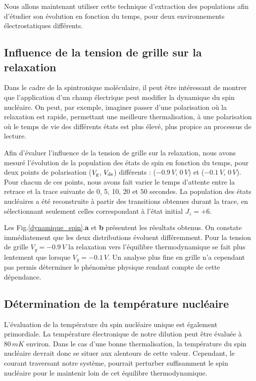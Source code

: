 Nous allons maintenant utiliser cette technique d'extraction des populations afin d'étudier son évolution en fonction du temps, pour deux environnements électrostatiques différents.

\subsection{Influence de la tension de grille sur la relaxation}
Dans le cadre de la spintronique moléculaire, il peut \^etre intéressant de montrer que l'application d'un champ électrique peut modifier la dynamique du spin nucléaire. On peut, par exemple, imaginer passer d'une polarisation où la relaxation est rapide, permettant une meilleure thermalisation, à une polarisation où le temps de vie des différents états est plus élevé, plus propice au processus de lecture.

Afin d'évaluer l'influence de la tension de grille sur la relaxation, nous avons mesuré l'évolution de la population des états de spin en fonction du temps, pour deux points de polarisation ($V_{\rm{g}}$, $V_{\rm{ds}}$) différents : ($-0.9\, V$, $0\, V$) et ($-0.1\, V$, $0\, V$). Pour chacun de ces points, nous avons fait varier le temps d'attente entre la retrace et la trace suivante de 0, 5, 10, 20 et 50 secondes. La population des états nucléaires a été reconstruite à partir des transitions obtenues durant la trace, en sélectionnant seulement celles correspondant à l'état initial $J_z=+6$.

Les Fig.\ref{dynamique_spin}.\textbf{a} et \textbf{b} présentent les résultats obtenus. On constate immédiatement que les deux distributions évoluent différemment. Pour la tension de grille $V_g = -0.9\,V$ la relaxation vers l'équilibre thermodynamique se fait plus lentement que lorsque $V_g = -0.1\,V$. Un analyse plus fine en grille n'a cependant pas permis déterminer le phénomène physique rendant compte de cette dépendance.

\subsection{Détermination de la température nucléaire}
L'évaluation de la température du spin nucléaire unique est également primordiale. La température électronique de notre dilution peut \^etre évaluée à $80\,mK$ environ. Dans le cas d'une bonne thermalisation, la température du spin nucléaire devrait donc se situer aux alentours de cette valeur. Cependant, le courant traversant notre système, pourrait perturber suffisamment le spin nucléaire pour le maintenir loin de cet équilibre thermodynamique. 


